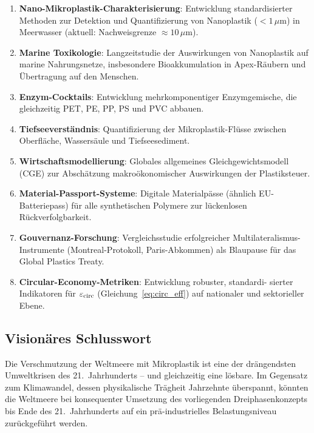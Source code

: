 ﻿\documentclass[12pt,a4paper]{article}
\theoremstyle{definition}
\theoremstyle{remark}
\newcommand{\MP}{Mikroplastik}
\newcommand{\NP}{Nanoplastik}
\begin{document}
\begin{enumerate}[leftmargin=*, label=\textbf{F\arabic*.}]
  \item \textbf{Nano-\MP{}-Charakterisierung}: Entwicklung standardisierter
        Methoden zur Detektion und Quantifizierung von \NP{}
        ($< 1\,\mu$m) in Meerwasser (aktuell: Nachweisgrenze $\approx 10\,\mu$m).
  \item \textbf{Marine Toxikologie}: Langzeitstudie der Auswirkungen von
        \NP{} auf marine Nahrungsnetze, insbesondere Bioakkumulation in
        Apex-R\"aubern und \"Ubertragung auf den Menschen.
  \item \textbf{Enzym-Cocktails}: Entwicklung mehrkomponentiger Enzymgemische,
        die gleichzeitig PET, PE, PP, PS und PVC abbauen.
  \item \textbf{Tiefseeverst\"andnis}: Quantifizierung der \MP{}-Fl\"usse
        zwischen Oberfl\"ache, Wassers\"aule und Tiefseesediment.
  \item \textbf{Wirtschaftsmodellierung}: Globales allgemeines Gleichgewichtsmodell
        (CGE) zur Absch\"atzung makro\"okonomischer Auswirkungen der Plastiksteuer.
  \item \textbf{Material-Passport-Systeme}: Digitale Materialpässe (\"ahnlich
        EU-Batteriepass) f\"ur alle synthetischen Polymere zur l\"uckenlosen
        Rückverfolgbarkeit.
  \item \textbf{Gouvernanz-Forschung}: Vergleichsstudie erfolgreicher
        Multilateralismus-Instrumente (Montreal-Protokoll, Paris-Abkommen)
        als Blaupause f\"ur das Global Plastics Treaty.
  \item \textbf{Circular-Economy-Metriken}: Entwicklung robuster, standardi-
        sierter Indikatoren f\"ur $\varepsilon_{\rm circ}$ (Gleichung~\eqref{eq:circ_eff})
        auf nationaler und sektorieller Ebene.
\end{enumerate}

\subsection{Visionäres Schlusswort}

Die Verschmutzung der Weltmeere mit Mikroplastik ist eine der dr\"angendsten
Umweltkrisen des 21.~Jahrhunderts -- und gleichzeitig eine lösbare.
Im Gegensatz zum Klimawandel, dessen physikalische Tr\"agheit Jahrzehnte
\"uberspannt, k\"onnten die Weltmeere bei konsequenter Umsetzung des
vorliegenden Dreiphasenkonzepts bis Ende des 21.~Jahrhunderts auf ein
pr\"a-industrielles Belastungsniveau zur\"uckgef\"uhrt werden.
\end{document}
